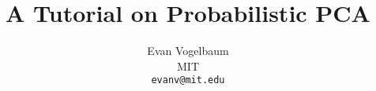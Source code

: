 \documentclass{article}
\title{A Tutorial on Probabilistic PCA}
\author{%
  Evan Vogelbaum\\
  MIT\\
  \texttt{evanv@mit.edu} \\
}
\begin{document}
\maketitle

\begin{abstract}
  
\end{abstract}














\newpage
\appendix

\end{document}
